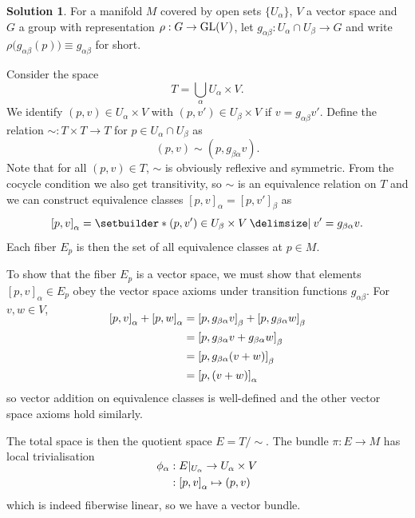 \documentclass[11pt, a4paper]{report}
\theoremstyle{definition}
\newtheorem{solution}{Solution}[part]
\newenvironment{sol}{\begin{solution}}{\end{solution}\pagebreak[3]}
\newcommand*{\GL}{\ensuremath\text{GL}}
\begin{document}
\begin{sol}

For a manifold $M$ covered by open sets $\{U_\alpha\}$, $V$ a vector space and $G$ a group with representation $\rho: G \to \GL(V)$, let $g_{\alpha\beta}: U_\alpha \cap U_\beta \to G$ and write $\rho \bigl(g_{\alpha\beta}(p) \bigr) \equiv g_{\alpha\beta}$ for short.

Consider the space
\[
    T = \bigcup_{\alpha} U_\alpha \times V.
\]
We identify $(p, v) \in U_\alpha \times V$ with $(p, v') \in U_\beta \times V$ if $v = g_{\alpha\beta} v'$.
Define the relation $\sim: T \times T \to T$ for $p \in U_\alpha \cap U_\beta$ as
\[
    (p, v) \sim (p, g_{\beta\alpha}v).
\]
Note that for all $(p, v) \in T$, $\sim$ is obviously reflexive and symmetric.
From the cocycle condition we also get transitivity, so $\sim$ is an equivalence relation on $T$ and we can construct equivalence classes ${[p, v]}_\alpha = {[p, v']}_\beta$ as
\[
    {[p, v]}_\alpha = \setbuilder*{ (p, v') \in U_\beta \times V \given v' = g_{\beta\alpha} v }.
\]
Each fiber $E_p$ is then the set of all equivalence classes at $p \in M$.

To show that the fiber $E_p$ is a vector space, we must show that elements ${[p, v]}_\alpha \in E_p$ obey the vector space axioms under transition functions $g_{\alpha\beta}$.
For $v, w \in V$,
\begin{align*}
    \SwapAboveDisplaySkip
    {[p, v]}_\alpha + {[p, w]}_\alpha &= {[p, g_{\beta\alpha}v]}_\beta
                                         + {[p, g_{\beta\alpha} w]}_\beta \\
        &= {[p, g_{\beta\alpha}v + g_{\beta\alpha}w]}_\beta \\
        &= {[p, g_{\beta\alpha}(v + w)]}_\beta \\
        &= {[p, (v + w)]}_\alpha
\end{align*}
so vector addition on equivalence classes is well-defined and the other vector space axioms hold similarly.

The total space is then the quotient space $E = T / \sim$.
The bundle $\pi: E \to M$ has local trivialisation
\begin{align*}
    \SwapAboveDisplaySkip
    \phi_\alpha &: E|_{U_\alpha} \to U_\alpha \times V \\
                &: {[p, v]}_\alpha \mapsto (p, v)
\end{align*}
which is indeed fiberwise linear, so we have a vector bundle.

\end{sol}
\end{document}
